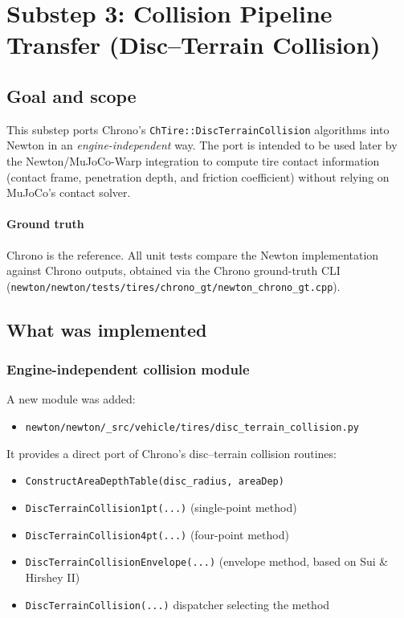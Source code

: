 \section{Substep 3: Collision Pipeline Transfer (Disc--Terrain Collision)}

\subsection{Goal and scope}
This substep ports Chrono's \texttt{ChTire::DiscTerrainCollision} algorithms into Newton in an \emph{engine-independent} way.
The port is intended to be used later by the Newton/MuJoCo-Warp integration to compute tire contact information
(contact frame, penetration depth, and friction coefficient) without relying on MuJoCo's contact solver.

\paragraph{Ground truth}
Chrono is the reference.
All unit tests compare the Newton implementation against Chrono outputs, obtained via the Chrono ground-truth CLI
(\texttt{newton/newton/tests/tires/chrono\_gt/newton\_chrono\_gt.cpp}).

\subsection{What was implemented}

\subsubsection{Engine-independent collision module}
A new module was added:
\begin{itemize}
  \item \texttt{newton/newton/\_src/vehicle/tires/disc\_terrain\_collision.py}
\end{itemize}

It provides a direct port of Chrono's disc--terrain collision routines:
\begin{itemize}
  \item \texttt{ConstructAreaDepthTable(disc\_radius, areaDep)}
  \item \texttt{DiscTerrainCollision1pt(...)} (single-point method)
  \item \texttt{DiscTerrainCollision4pt(...)} (four-point method)
  \item \texttt{DiscTerrainCollisionEnvelope(...)} (envelope method, based on Sui \& Hirshey II)
  \item \texttt{DiscTerrainCollision(...)} dispatcher selecting the method
\end{itemize}

